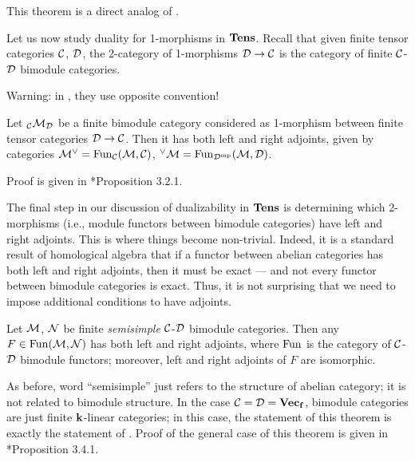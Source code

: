 This theorem is a direct analog of .

Let us now study duality for 1-morphisms in $\mathbf{Tens}$. Recall that given finite
tensor categories $\mathcal{C}$, $\mathcal{D}$, the 2-category of 1-morphisms
$\mathcal{D}\to\mathcal{C}$ is the category of finite $\mathcal{C}$-$\mathcal{D}$ bimodule categories.

Warning: in , they use opposite convention!

\begin{theorem}\label{t:bimodule-dualizable}
  Let ${}_{\mathcal{C}}\mathcal{M}_{\mathcal{D}}$ be a finite bimodule category considered as
  1-morphism between finite tensor categories $\mathcal{D}\to\mathcal{C}$. Then it has both
  left and right adjoints, given by categories $\mathcal{M}^\vee=\operatorname{Fun}_{\mathcal{C}}(\mathcal{M},
  \mathcal{C})$, ${}^\vee\mathcal{M}=\operatorname{Fun}_{\mathcal{D}^{\mathrm{mp}}}(\mathcal{M}, \mathcal{D})$.
\end{theorem}

Proof is given in *{Proposition 3.2.1}.


The final step in our discussion of dualizability in $\mathbf{Tens}$ is determining
which 2-morphisms (i.e., module functors between bimodule categories) have left
and right adjoints. This is where things become non-trivial. Indeed, it is a
standard result of homological algebra that if a functor between abelian
categories has both left and right adjoints, then it must be exact --- and not
every functor between bimodule categories is exact. Thus, it is not surprising
that we need to impose additional conditions to have adjoints.

\begin{theorem}\label{t:tens-dual-2-morph}
  Let $\mathcal{M}$, $\mathcal{N}$ be finite \emph{semisimple} $\mathcal{C}$-$\mathcal{D}$ bimodule
  categories. Then any $F\in \operatorname{Fun} (\mathcal{M}, \mathcal{N})$ has both left and right
  adjoints, where $\operatorname{Fun}$ is the category of $\mathcal{C}$-$\mathcal{D}$ bimodule functors;
  moreover, left and right adjoints of $F$ are isomorphic.
\end{theorem}
As before, word ``semisimple'' just refers to the structure of abelian category;
it is not related to bimodule structure.
In the case $\mathcal{C}=\mathcal{D}=\mathbf{Vec_f}$, bimodule categories are just finite
$\mathbf{k}$-linear categories; in this case, the statement of this theorem is exactly
the statement of . Proof of the general case of this
theorem is given in  *{Proposition 3.4.1}.

